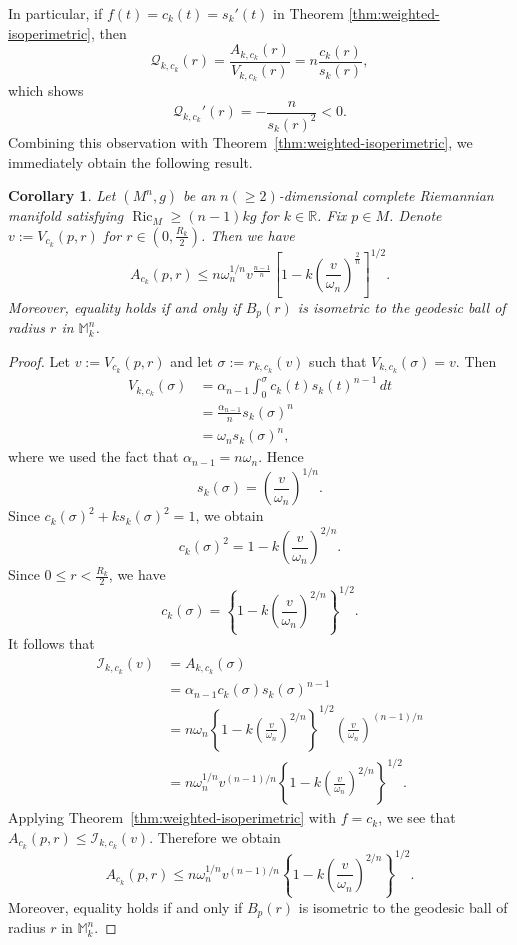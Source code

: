 \documentclass[11pt]{article}
\newtheorem{corollary}[theorem]{Corollary}
\newcommand{\Ric}{\operatorname{Ric}}
\begin{document}
\noindent In particular, if $f(t)=c_k(t)=s_k'(t)$ in Theorem \ref{thm:weighted-isoperimetric}, then 
$$
\mathcal{Q}_{k,c_k}(r) = \frac{A_{k,c_k}(r)}{V_{k,c_k}(r)}=n\frac{c_k(r)}{s_k(r)},
$$
which shows 
$$\mathcal{Q}_{k,c_k}'(r) = -\frac{n}{s_k(r)^2}<0.$$
Combining this observation with Theorem~\ref{thm:weighted-isoperimetric}, we immediately obtain the following result.





\begin{corollary} 
\label{cor:ck-isoperimetric}
Let $(M^n,g)$ be an $n(\geq 2)$-dimensional complete Riemannian manifold satisfying $\Ric_M\geq(n-1)kg$ for $k \in \mathbb{R}$. Fix \(p\in M\). Denote $v:=V_{c_k}(p,r)$ for $r \in (0, \frac{R_k}{2})$. Then we have
\[
A_{c_k}(p,r)
\leq
n\omega_n^{1/n}
v^{\frac{n-1}{n}}
\left[
1-
k\left(
\frac{v}{\omega_n}
\right)^{\frac{2}{n}}
\right]^{1/2}.
\]
Moreover, equality holds if and only if $B_p(r)$ is isometric to the geodesic ball of radius $r$ in $\mathbb{M}_k^n$.
\end{corollary}




\begin{proof}
Let $ v:=V_{c_k}(p,r)$ and let $\sigma:=r_{k,c_k}(v)$ such that $V_{k,c_k}(\sigma)=v$. Then 
\begin{align*}
V_{k,c_k}(\sigma)
&=
\alpha_{n-1}
\int_0^\sigma c_k(t)s_k(t)^{n-1}\,dt \\
&=
\frac{\alpha_{n-1}}{n}s_k(\sigma)^n \\
&=
\omega_n s_k(\sigma)^n,
\end{align*}
where we used the fact that $\alpha_{n-1}=n\omega_n$. Hence
$$
s_k(\sigma)
=
\left(\frac{v}{\omega_n}\right)^{1/n}.
$$
Since $c_k(\sigma)^2+k s_k(\sigma)^2=1$, we obtain
$$
c_k(\sigma)^2
=
1-k\left(\frac{v}{\omega_n}\right)^{2/n}.
$$
Since $0\leq r<\frac{R_k}{2}$, we have 
$$
c_k(\sigma)
=
\left\{
1-k\left(\frac{v}{\omega_n}\right)^{2/n}
\right\}^{1/2}.
$$
It follows that
\begin{align*}
\mathcal{I}_{k,c_k}(v)
&=
A_{k,c_k}(\sigma) \\
&=
\alpha_{n-1}c_k(\sigma)s_k(\sigma)^{n-1} \\
&=
n\omega_n
\left\{
1-k\left(\frac{v}{\omega_n}\right)^{2/n}
\right\}^{1/2}
\left(\frac{v}{\omega_n}\right)^{(n-1)/n} \\
&=
n\omega_n^{1/n}v^{(n-1)/n}
\left\{
1-k\left(\frac{v}{\omega_n}\right)^{2/n}
\right\}^{1/2}.
\end{align*}
Applying Theorem~\ref{thm:weighted-isoperimetric} with $f=c_k$, we see that $A_{c_k}(p,r)\leq \mathcal{I}_{k,c_k}(v)$. Therefore we obtain
$$
A_{c_k}(p,r)
\leq
n\omega_n^{1/n}v^{(n-1)/n}
\left\{
1-k\left(\frac{v}{\omega_n}\right)^{2/n}
\right\}^{1/2}.
$$
Moreover, equality holds if and only if $B_p(r)$ is isometric to the geodesic ball of radius $r$ in $\mathbb{M}_k^n$. 
\end{proof}
\end{document}
